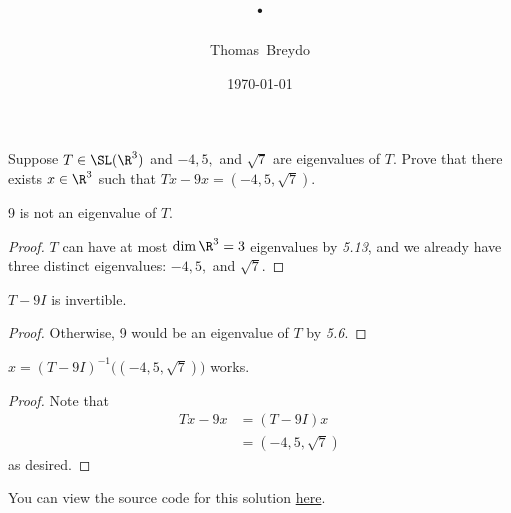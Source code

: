 \documentclass{amsart}
\title{\pagenum.\probnum}
\author{Thomas\ Breydo}
\date{\today}
\newcommand{\pagenum}{140}
\newcommand{\probnum}{30}
\begin{document}
\maketitle

\begin{problem*}
Suppose $T\in\SL(\R^3)$ and $-4,5,$ and $\sqrt 7$
are eigenvalues of $T.$ Prove that there exists $x\in\R^3$
such that $Tx-9x=(-4,5,\sqrt 7).$
\end{problem*}

\vspace{0.5in}

\begin{claim*}
9 is not an eigenvalue of $T.$
\end{claim*}
\begin{proof}
$T$ can have at most $\dim\R^3=3$ eigenvalues by \textit{5.13},
and we already have three distinct eigenvalues: $-4,5,$ and
$\sqrt 7$.
\end{proof}

\begin{claim*}
$T-9I$ is invertible.
\end{claim*}
\begin{proof}
Otherwise, 9 would be an eigenvalue of $T$ by \textit{5.6}.
\end{proof}

\begin{claim*}
    $x=(T-9I)^{-1}\big((-4,5,\sqrt 7)\big)$ works.
\end{claim*}
\begin{proof} Note that
\begin{align*} 
    Tx-9x &= (T-9I)x \\
          &= (-4,5,\sqrt 7)
\end{align*}
as desired.
\end{proof}

\vspace{0.5in}

\begin{note*}
You can view the source code for this solution
\href{https://github.com/thomasbreydo/linalg/blob/main/\pagenum_\probnum_Thomas_Breydo.tex}
{here}.
\end{note*}
\end{document}

